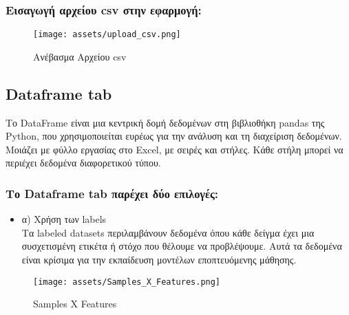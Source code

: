 \documentclass[a4paper,12pt]{article}
\begin{document}
\newpage
\subsubsection{Εισαγωγή αρχείου csv στην εφαρμογή:}

\begin{figure}[h!]
  \centering
  \texttt{[image: assets/upload\_csv.png]}
  \caption{Ανέβασμα Αρχείου  csv}
  \label{fig:upload_csv}
\end{figure}

\newpage
\subsection{Dataframe tab}
Το DataFrame είναι μια κεντρική δομή δεδομένων στη βιβλιοθήκη pandas της Python, που χρησιμοποιείται ευρέως για την ανάλυση και τη διαχείριση δεδομένων. Μοιάζει με φύλλο εργασίας στο Excel, με σειρές και στήλες. Κάθε στήλη μπορεί να περιέχει δεδομένα διαφορετικού τύπου.

\newpage
\subsubsection{Το Dataframe tab παρέχει δύο επιλογές:}
\begin{itemize}
    \item α) Χρήση των labels\\
    Τα labeled datasets περιλαμβάνουν δεδομένα όπου κάθε δείγμα έχει μια συσχετισμένη ετικέτα ή στόχο που θέλουμε να προβλέψουμε. Αυτά τα δεδομένα είναι κρίσιμα για την εκπαίδευση μοντέλων εποπτευόμενης μάθησης.
\end{itemize}

\begin{figure}[h!]
  \centering
  \texttt{[image: assets/Samples\_X\_Features.png]}
  \caption{Samples X Features }
  \label{fig:samples_X_features}
\end{figure}
\end{document}
